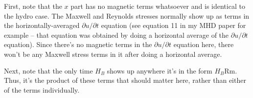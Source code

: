 \documentclass[aps,pop,preprint]{revtex4}
\newcommand{\Rm}{\mathrm{Rm}}
\begin{document}
First, note that the $x$ part has no magnetic terms whatsoever and is identical to the hydro case. 
The Maxwell and Reynolds stresses normally show up as terms in the horizontally-averaged $\partial u/ \partial t$ equation (see equation 11 in my MHD paper for example -- that equation was obtained by doing a horizontal average of the $\partial u/ \partial t$ equation). 
Since there's no magnetic terms in the $\partial u/ \partial t$ equation here, there won't be any Maxwell stress terms in it after doing a horizontal average. 

Next, note that the only time $H_B$ shows up anywhere it's in the form $H_B \Rm$. 
Thus, it's the product of these terms that should matter here, rather than either of the terms individually.
\end{document}
